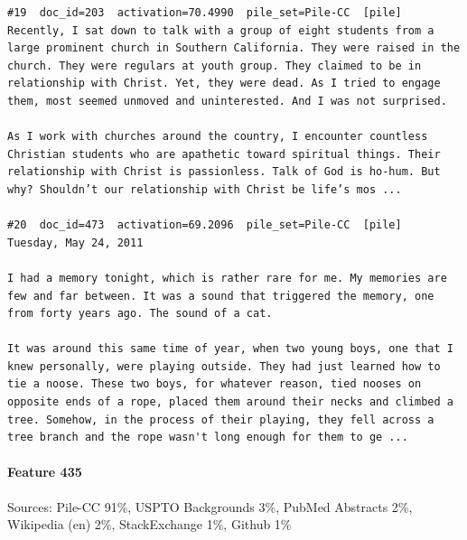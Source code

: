 \begin{verbatim}
#19  doc_id=203  activation=70.4990  pile_set=Pile-CC  [pile]
Recently, I sat down to talk with a group of eight students from a large prominent church in Southern California. They were raised in the church. They were regulars at youth group. They claimed to be in relationship with Christ. Yet, they were dead. As I tried to engage them, most seemed unmoved and uninterested. And I was not surprised.

As I work with churches around the country, I encounter countless Christian students who are apathetic toward spiritual things. Their relationship with Christ is passionless. Talk of God is ho-hum. But why? Shouldn’t our relationship with Christ be life’s mos ...

#20  doc_id=473  activation=69.2096  pile_set=Pile-CC  [pile]
Tuesday, May 24, 2011

I had a memory tonight, which is rather rare for me. My memories are few and far between. It was a sound that triggered the memory, one from forty years ago. The sound of a cat.

It was around this same time of year, when two young boys, one that I knew personally, were playing outside. They had just learned how to tie a noose. These two boys, for whatever reason, tied nooses on opposite ends of a rope, placed them around their necks and climbed a tree. Somehow, in the process of their playing, they fell across a tree branch and the rope wasn't long enough for them to ge ...

\end{verbatim}

\paragraph*{Feature 435} Sources: Pile-CC 91\%, USPTO Backgrounds 3\%, PubMed Abstracts 2\%, Wikipedia (en) 2\%, StackExchange 1\%, Github 1\%

